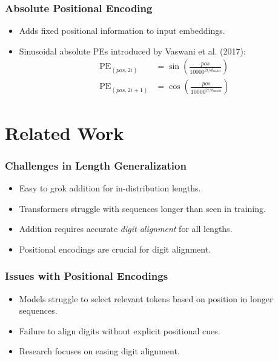 \documentclass[14pt,aspectratio=169]{beamer}
\theoremstyle{remark}
\begin{document}
\begin{frame}
    \frametitle{Absolute Positional Encoding}
    \begin{itemize}
        \item Adds fixed positional information to input embeddings.
        \item Sinusoidal absolute PEs introduced by Vaswani et al. (2017):
              \[
                  \begin{aligned}
                      \text{PE}_{(pos, 2i)}   & = \sin\left( \frac{pos}{10000^{2i / d_{\text{model}}}} \right) \\
                      \text{PE}_{(pos, 2i+1)} & = \cos\left( \frac{pos}{10000^{2i / d_{\text{model}}}} \right)
                  \end{aligned}
              \]
    \end{itemize}
\end{frame}

\section{Related Work}
\begin{frame}
    \frametitle{Challenges in Length Generalization}
    \begin{itemize}
        \item Easy to grok addition for in-distribution lengths.
        \item Transformers struggle with sequences longer than seen in training.
        \item Addition requires accurate \emph{digit alignment} for all lengths.
        \item Positional encodings are crucial for digit alignment.
    \end{itemize}
\end{frame}

\begin{frame}
    \frametitle{Issues with Positional Encodings}
    \begin{itemize}
        \item Models struggle to select relevant tokens based on position in longer sequences.
        \item Failure to align digits without explicit positional cues.
        \item Research focuses on easing digit alignment.
    \end{itemize}
\end{frame}
\end{document}
